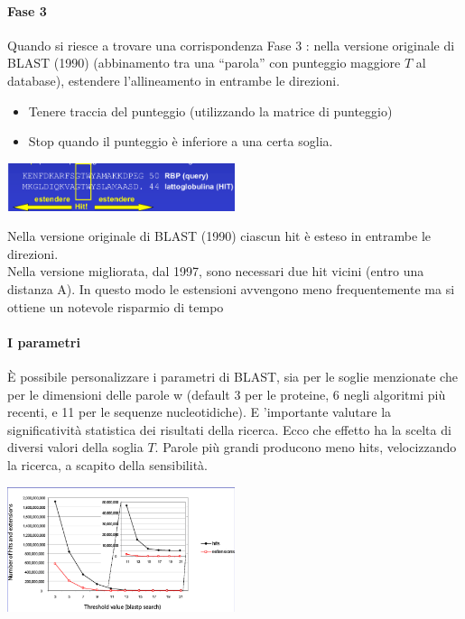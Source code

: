 \documentclass{article}
\begin{document}
\paragraph{Fase 3}Quando si riesce a trovare una corrispondenza Fase 3 : nella versione originale di BLAST (1990)
(abbinamento tra una “parola” con punteggio maggiore $T$ al database),
estendere l’allineamento in entrambe le direzioni.
\begin{itemize}
    \item Tenere traccia del punteggio (utilizzando la matrice di
    punteggio)
    \item Stop quando il punteggio è inferiore a una certa soglia.
\end{itemize}
\begin{center}
    \includegraphics[width=0.5\textwidth]{figures/fase3.png}
\end{center}
Nella versione originale di BLAST (1990) ciascun hit è esteso in entrambe le direzioni.\\
Nella versione migliorata, dal 1997, sono necessari due
hit vicini (entro una distanza A). In questo modo le
estensioni avvengono meno frequentemente ma si
ottiene un notevole risparmio di tempo
\paragraph{I parametri}
È possibile personalizzare i parametri di BLAST, sia per le soglie
menzionate che per le dimensioni delle parole w (default 3 per le
proteine, 6 negli algoritmi più recenti, e 11 per le sequenze
nucleotidiche).
E 'importante valutare la significatività statistica dei risultati
della ricerca.
Ecco che effetto ha la scelta di diversi valori della soglia $T$.
Parole più grandi
producono meno
hits, velocizzando
la ricerca, a scapito
della sensibilità.
\begin{center}
    \includegraphics[width=0.5\textwidth]{figures/param.png}
\end{center}
\end{document}
